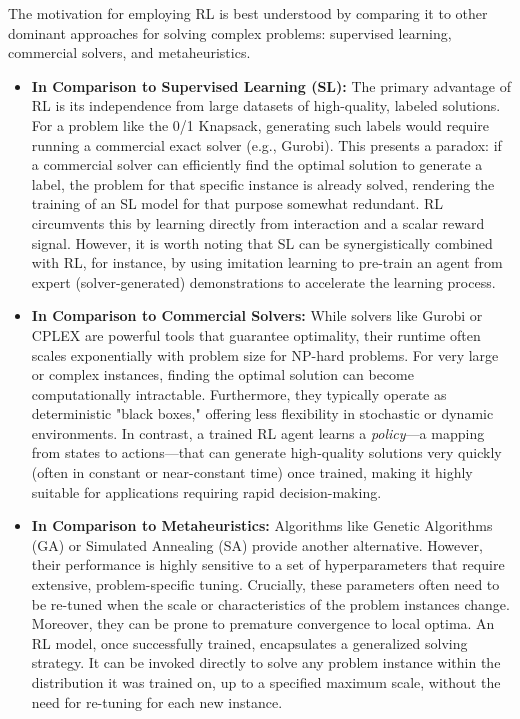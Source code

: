 The motivation for employing RL is best understood by comparing it to other dominant approaches for solving complex problems: supervised learning, commercial solvers, and metaheuristics.
\begin{itemize}
    \item \textbf{In Comparison to Supervised Learning (SL):} The primary advantage of RL is its independence from large datasets of high-quality, labeled solutions.
For a problem like the 0/1 Knapsack, generating such labels would require running a commercial exact solver (e.g., Gurobi).
This presents a paradox: if a commercial solver can efficiently find the optimal solution to generate a label, the problem for that specific instance is already solved, rendering the training of an SL model for that purpose somewhat redundant.
RL circumvents this by learning directly from interaction and a scalar reward signal.
However, it is worth noting that SL can be synergistically combined with RL, for instance, by using imitation learning to pre-train an agent from expert (solver-generated) demonstrations to accelerate the learning process.
\item \textbf{In Comparison to Commercial Solvers:} While solvers like Gurobi or CPLEX are powerful tools that guarantee optimality, their runtime often scales exponentially with problem size for NP-hard problems.
For very large or complex instances, finding the optimal solution can become computationally intractable.
Furthermore, they typically operate as deterministic "black boxes," offering less flexibility in stochastic or dynamic environments.
In contrast, a trained RL agent learns a \textit{policy}---a mapping from states to actions---that can generate high-quality solutions very quickly (often in constant or near-constant time) once trained, making it highly suitable for applications requiring rapid decision-making.
\item \textbf{In Comparison to Metaheuristics:} Algorithms like Genetic Algorithms (GA) or Simulated Annealing (SA) provide another alternative.
However, their performance is highly sensitive to a set of hyperparameters that require extensive, problem-specific tuning.
Crucially, these parameters often need to be re-tuned when the scale or characteristics of the problem instances change.
Moreover, they can be prone to premature convergence to local optima.
An RL model, once successfully trained, encapsulates a generalized solving strategy.
It can be invoked directly to solve any problem instance within the distribution it was trained on, up to a specified maximum scale, without the need for re-tuning for each new instance.
\end{itemize}

